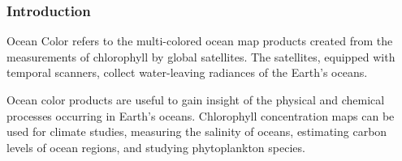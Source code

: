 \begin{frame}\frametitle{Introduction} 
Ocean Color refers to the multi-colored ocean map products created from the measurements of chlorophyll by global satellites. The satellites, equipped with temporal scanners, collect water-leaving radiances of the Earth’s oceans.

Ocean color products are useful to gain insight of the physical and chemical processes occurring in Earth’s oceans. Chlorophyll concentration maps can be used for climate studies, measuring the salinity of oceans, estimating carbon levels of ocean regions, and studying phytoplankton species.

\end{frame}
